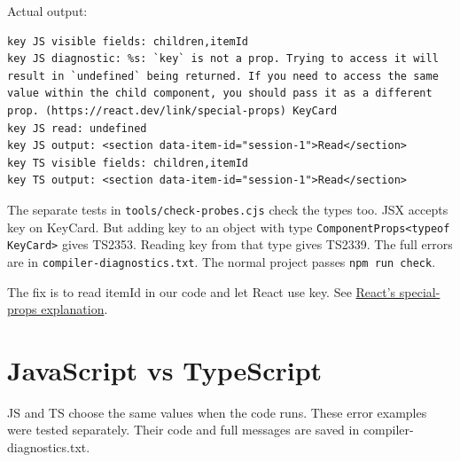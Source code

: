 \documentclass[
  10pt,
  a4paper,
]{article}
\begin{document}

Actual output:

\begin{minipage}{\linewidth}

\begin{lstlisting}
key JS visible fields: children,itemId
key JS diagnostic: %s: `key` is not a prop. Trying to access it will result in `undefined` being returned. If you need to access the same value within the child component, you should pass it as a different prop. (https://react.dev/link/special-props) KeyCard
key JS read: undefined
key JS output: <section data-item-id="session-1">Read</section>
key TS visible fields: children,itemId
key TS output: <section data-item-id="session-1">Read</section>
\end{lstlisting}

\end{minipage}\par

The separate tests in
\texttt{tools/\allowbreak{}check-probes.\allowbreak{}cjs} check the
types too. JSX accepts key on KeyCard. But adding key to an object with
type \texttt{ComponentProps<typeof KeyCard>} gives TS2353. Reading key
from that type gives TS2339. The full errors are in
\texttt{compiler-diagnostics.\allowbreak{}txt}. The normal project
passes \texttt{npm run check}.

The fix is to read itemId in our code and let React use key. See
\href{https://react.dev/warnings/special-props}{React's special-props
explanation}.


\section{JavaScript vs TypeScript}\label{javascript-vs-typescript}

JS and TS choose the same values when the code runs. These error
examples were tested separately. Their code and full messages are saved
in compiler-diagnostics.txt.
\end{document}
